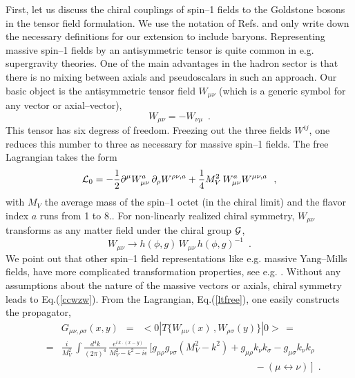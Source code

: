 First, let us discuss the chiral couplings of spin--1 fields
to the Goldstone bosons in the tensor field formulation. We use the
notation of Refs.\cite{reso,reso1} and only write down the necessary
definitions for our extension to include baryons. Representing massive
spin--1 fields by an antisymmetric tensor is quite common in
e.g. supergravity theories. One of the main advantages in the hadron
sector is that there is no mixing between axials and pseudoscalars in
such an approach. Our basic object is the antisymmetric tensor field
$W_{\mu \nu}$ (which is a generic symbol for any vector or axial--vector),
\begin{equation}
W_{\mu \nu} = - W_{\nu \mu} \, \, \, .
\label{defwmunu}
\end{equation}
This tensor has six degress of freedom. Freezing out the three fields
$W^{ij}$, one reduces this number to three as necessary for massive
spin--1 fields. The free Lagrangian takes the form \cite{reso}
\begin{equation}
{\cal L}_0 = - \frac{1}{2} \partial^\mu W_{\mu \nu}^a \, \partial_\rho
W^{\rho \nu, a} + \frac{1}{4} M_V^2 \, W_{\mu \nu}^a W^{\mu \nu , a}
\, \, \, \, ,
\label{ltfree}
\end{equation}
with $M_V$ the average mass of the spin--1 octet (in the chiral limit)
and the flavor index $a$ runs from 1 to 8.. For non-linearly realized
chiral symmetry, $W_{\mu \nu}$ transforms as any matter field under
the chiral group ${\cal G}$,
\begin{equation}
W_{\mu \nu} \to h(\phi,g) \, W_{\mu \nu} \, h(\phi,g)^{-1} \, \, \, .
\label{ccwzw}
\end{equation}
We point out that other spin--1 field representations like e.g. massive
Yang--Mills fields, have  more complicated transformation properties,
see e.g. \cite{ulfpr,reso1}. Without any assumptions about the nature
of the massive vectors or axials, chiral symmetry leads to Eq.(\ref{ccwzw}).
{}From the Lagrangian, Eq.(\ref{ltfree}), one easily constructs the propagator,
\begin{eqnarray}
& & G_{\mu \nu , \rho \sigma} (x,y) \, \, \, = \, \, \,
< 0 | T \{ W_{\mu \nu} (x) \, , W_{\rho \sigma} (y) \} |0> \, = \nonumber \\
& = &\frac{i}{M_V^2} \, \int \frac{d^4k}{(2\pi)^4} \,
\frac{e^{i \, k \cdot (x-y)}}{M_V^2 -k^2 - i\epsilon} \,
\bigl[ g_{\mu
  \rho} g_{\nu \sigma} (M_V^2 - k^2) + g_{\mu \rho} k_\nu k_\sigma -
g_{\mu \sigma} k_\nu k_\rho \nonumber \\
& & \qquad \qquad \qquad \qquad \qquad \qquad \qquad \qquad \qquad \qquad
- (\mu \leftrightarrow \nu) \, \bigr]
 \, \, \, .
\label{propw}
\end{eqnarray}
